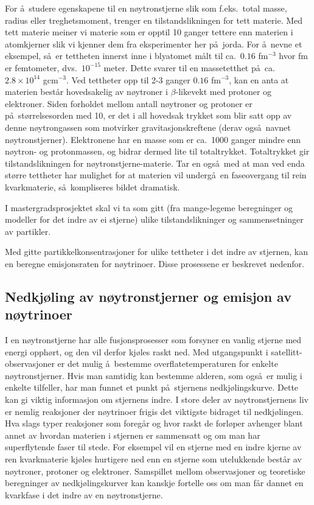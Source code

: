 For \aa\ studere egenskapene til en n\o ytronstjerne
slik som f.eks.\ total masse, radius eller treghetsmoment,
trenger en tilstandslikningen for tett materie.
Med tett materie meiner vi materie som er opptil 
10 ganger tettere enn materien i atomkjerner 
slik vi kjenner dem fra eksperimenter her p\aa\ jorda.
For \aa\ nevne et eksempel, s\aa\ er tettheten
innerst inne i blyatomet m\aa lt til ca.\
$0.16$ fm$^{-3}$ hvor fm er femtometer, dvs.\ $10^{-15}$
meter. Dette svarer til en massetetthet p\aa\ ca.\
$2.8\times 10^{14}$ gcm$^{-3}$. Ved tettheter opp til
2-3 ganger $0.16$ fm$^{-3}$, kan en anta at materien
best\aa r hovedsakelig av n\o ytroner i 
$\beta$-likevekt med protoner og elektroner. 
Siden forholdet mellom antall n\o ytroner og protoner
er p\aa\ st\o rrelsesorden med 10, er det i all hovedsak
trykket som blir satt opp av denne n\o ytrongassen
som motvirker gravitasjonskreftene (derav ogs\aa\ navnet
n\o ytronstjerner). Elektronene har en masse som er ca.\
1000 ganger mindre enn n\o ytron- og protonmassen,
og bidrar dermed lite til totaltrykket.
Totaltrykket gir tilstandslikningen for n\o ytronstjerne-materie.
Tar en ogs\aa\ med at man ved
enda st\o rre tettheter har mulighet for at 
materien vil underg\aa\ en faseovergang til rein
kvarkmaterie, s\aa\ kompliseres bildet dramatisk.

I mastergradsprosjektet skal vi ta som gitt (fra mange-legeme
beregninger og modeller for det indre av ei stjerne) ulike
tilstandslikninger og sammensetninger av partikler. 

Med gitte partikkelkonsentrasjoner
for ulike tettheter i det indre av stjernen, kan en beregne
emisjonsraten for n\o ytrinoer. Disse prosessene er beskrevet nedenfor.




\subsection*{Nedkj\o ling av n\o ytronstjerner og emisjon av n\o ytrinoer}

I en n\o ytronstjerne har alle fusjonsprosesser som 
forsyner en vanlig stjerne med energi opph\o rt, og 
den vil derfor kj\o les raskt ned.  
Med utgangspunkt i satellitt-observasjoner er det mulig 
\aa\ bestemme overflatetemperaturen for enkelte n\o ytronstjerner.  
Hvis man samtidig kan bestemme alderen, som ogs\aa \  er mulig 
i enkelte tilfeller, har man funnet et punkt p\aa \ stjernens 
nedkj\o lingskurve.  Dette kan gi viktig informasjon om 
stjernens indre.  
I store deler av n\o ytronstjernens liv er nemlig reaksjoner 
der n\o ytrinoer frigis det viktigste bidraget til nedkj\o lingen.  
Hva slags typer reaksjoner som foreg\aa r og hvor raskt de 
forl\o per avhenger blant annet av hvordan materien i stjernen er 
sammensatt og om man har superflytende faser til stede.  
For eksempel vil en stjerne med en indre kjerne av ren kvarkmaterie 
kj\o les hurtigere ned enn en stjerne som utelukkende best\aa r 
av n\o ytroner, protoner og elektroner.   
Samspillet mellom observasjoner og teoretiske beregninger av 
nedkj\o lingskurver kan kanskje fortelle oss om man f\aa r 
dannet en kvarkfase i det indre av en n\o ytronstjerne.  


